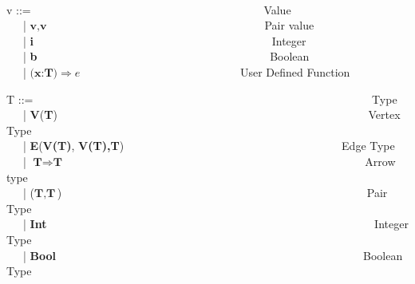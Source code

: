 \begin{frame}
{\ \\
  v ::= \ \ \ \ \ \ \ \ \ \ \ \ \ \ \ \ \ \ \ \ \ \ \ \ \ \ \ \ \ \ \ \ \ \ \ \ \ \ \ \ \ Value \\
    \ \ \ | $\textbf{v},\textbf{v}$ \ \ \ \ \ \ \ \ \ \ \ \ \ \ \ \ \ \ \ \ \ \ \ \ \ \ \ \ \ \ \ \ \ \ \ \ \ \ Pair value \\
    \ \ \ | \textbf{i} \ \ \ \ \ \ \ \ \ \ \ \ \ \ \ \  \ \ \ \ \ \ \ \ \ \ \ \ \ \ \ \ \ \ \ \ \ \ \ \ \ \ Integer \\
    \ \ \ | \textbf{b} \ \ \ \ \ \ \ \ \ \ \ \ \ \ \ \ \ \ \ \ \ \ \ \ \ \ \ \ \ \ \ \ \ \ \ \ \ \ \ \ \ Boolean \\
    \ \ \ | $\textbf{(x:T)} \Rightarrow e $ \ \ \ \ \ \ \ \ \ \ \ \ \ \ \ \ \ \ \ \ \ \ \ \ \ \ \ \  User Defined Function \\
    }
\end{frame}

\begin{frame}
  \tiny{
  T ::= \ \ \ \ \ \ \ \ \ \ \ \ \ \ \ \ \ \ \ \ \ \ \ \ \ \ \ \ \ \ \ \ \ \ \ \ \ \ \ \ \ \ \ \ \ \ \ \ \ \ \ \ \ \ \ \ \ \ \ \ Type \\
    \ \ \ | \textbf{V}(\textbf{T}) \ \ \ \ \ \ \ \ \ \ \ \ \ \ \ \ \ \ \ \ \ \ \ \ \ \ \ \ \ \ \ \ \ \ \ \ \ \ \ \ \ \ \ \ \ \ \ \ \ \ \ \ \ \ \ Vertex Type \\
    \ \ \ | \textbf{E}(\textbf{V(T)}, \textbf{V(T),}\textbf{T})\ \ \ \ \ \ \ \ \ \ \ \ \ \ \ \ \ \ \ \ \ \ \ \ \ \ \ \ \ \ \ \ \ \ \ \ \ \ \  Edge Type\\
    \ \ \ | $\textbf{T} \Rightarrow \textbf{T}$ \ \ \ \ \ \ \ \ \ \  \ \ \ \ \ \ \ \ \ \ \ \ \ \ \ \ \ \ \ \ \ \ \ \ \ \ \ \ \ \  \ \ \ \ \ \ \ \ \ \ \ \ \ Arrow type \\
    \ \ \ | ($\textbf{T}, \textbf{T}$) \ \ \ \ \ \ \ \ \ \ \ \ \ \ \ \ \ \ \ \ \ \ \ \ \ \ \ \ \ \ \ \ \ \ \ \ \ \ \ \ \ \ \ \ \ \ \ \ \ \ \ \ \ \ Pair Type \\
    \ \ \ | \textbf{Int} \ \ \ \ \ \ \ \ \ \ \ \ \ \ \ \ \ \ \ \ \ \ \ \ \ \ \ \ \ \ \ \ \ \ \ \ \ \ \ \ \ \ \ \ \ \ \ \ \ \ \ \ \ \ \ \ \ \ Integer Type \\
    \ \ \ | \textbf{Bool}\ \ \ \ \ \ \ \ \ \ \ \  \ \ \ \ \ \ \ \ \ \ \ \ \ \ \ \ \ \ \ \ \ \ \ \ \ \ \ \ \ \ \ \ \ \ \ \ \ \ \ \ \ \ \  Boolean Type
}
\end{frame}

